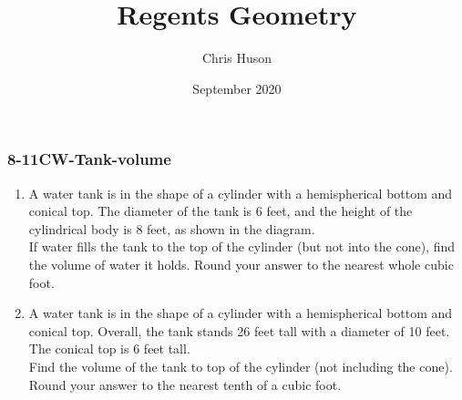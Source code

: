 \documentclass[12pt, twoside]{article}
\title{Regents Geometry}
\author{Chris Huson}
\date{September 2020}
\begin{document}
\subsubsection*{8-11CW-Tank-volume}
\begin{enumerate}
\item A water tank is in the shape of a cylinder with a hemispherical bottom and conical top. The diameter of the tank is 6 feet, and the height of the cylindrical body is 8 feet, as shown in the diagram. \\[0.25cm]
  If water fills the tank to the top of the cylinder (but not into the cone), find the volume of water it holds. Round your answer to the nearest whole cubic foot.
  \begin{flushright}
\end{flushright} %

\item A water tank is in the shape of a cylinder with a hemispherical bottom and conical top. Overall, the tank stands 26 feet tall with a diameter of 10 feet. The conical top is 6 feet tall. \\[0.25cm]
  Find the volume of the tank to top of the cylinder (not including the cone). Round your answer to the nearest tenth of a cubic foot.
  \begin{flushright}
\end{flushright}


\end{enumerate}
\end{document}
